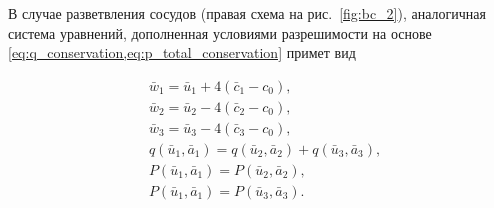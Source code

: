 В случае разветвления сосудов (правая схема на рис.~\ref{fig:bc_2}), аналогичная система уравнений,
дополненная условиями разрешимости на основе \cref{eq:q_conservation,eq:p_total_conservation} примет вид

\begin{equation}
\label{eq:sys3}
\begin{aligned}
&\bar w_1 = \bar u_1 + 4 (\bar c_1 - c_0), \\
&\bar w_2 = \bar u_2 - 4 (\bar c_2 - c_0), \\
&\bar w_3 = \bar u_3 - 4 (\bar c_3 - c_0), \\
&q(\bar u_1, \bar a_1) = q(\bar u_2, \bar a_2) + q(\bar u_3, \bar a_3), \\
&P(\bar u_1, \bar a_1) = P(\bar u_2, \bar a_2), \\
&P(\bar u_1, \bar a_1) = P(\bar u_3, \bar a_3).
\end{aligned}
\end{equation}
